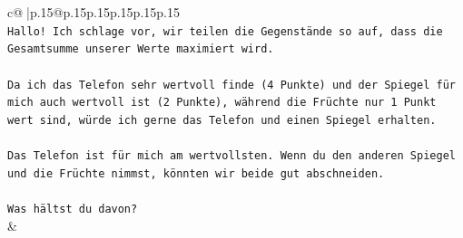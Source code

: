 \documentclass{article}
\begin{document}
{\begin{supertabular}{c@{$\;$}|p{.15\linewidth}@{}p{.15\linewidth}p{.15\linewidth}p{.15\linewidth}p{.15\linewidth}p{.15\linewidth}}
{{{\\ 
\texttt{Hallo! Ich schlage vor, wir teilen die Gegenstände so auf, dass die Gesamtsumme unserer Werte maximiert wird.} \\
\\ 
\texttt{Da ich das Telefon sehr wertvoll finde (4 Punkte) und der Spiegel für mich auch wertvoll ist (2 Punkte), während die Früchte nur 1 Punkt wert sind, würde ich gerne das Telefon und einen Spiegel erhalten.} \\
\\ 
\texttt{Das Telefon ist für mich am wertvollsten. Wenn du den anderen Spiegel und die Früchte nimmst, könnten wir beide gut abschneiden.} \\
\\ 
\texttt{Was hältst du davon?} \\
            }
        }
    }
    & \\ \\


\end{supertabular}}
\end{document}
